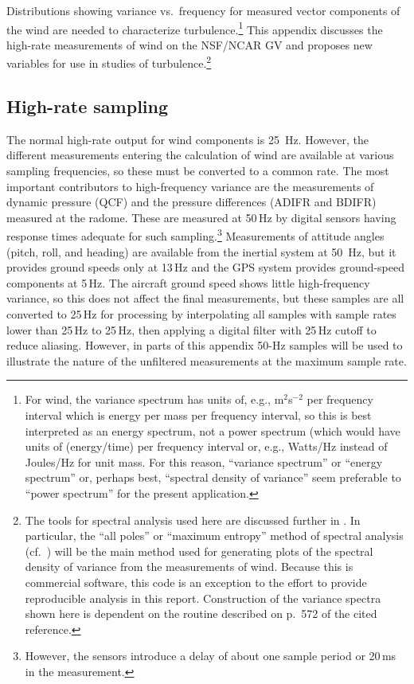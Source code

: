 \documentclass[12pt,twoside,english]{article}\usepackage[]{graphicx}\usepackage[]{color}
\let\OrgIndex\index
\renewcommand*{\index}[1]{\OrgIndex{#1}}
\begin{document}
Distributions showing variance vs.~frequency for measured vector components of the wind are needed to characterize turbulence.\footnote{For wind, the variance spectrum has units of, e.g., m$^{2}$s$^{-2}$ per frequency interval which is energy per mass per frequency interval, so this is best interpreted as an energy spectrum, not a power spectrum (which would have units of (energy/time) per frequency interval or, e.g., Watts/Hz instead of Joules/Hz for unit mass. For this reason, ``variance spectrum'' or ``energy spectrum'' or, perhaps best, ``spectral density of variance'' seem preferable to ``power spectrum'' for the present application.} This appendix discusses the high-rate measurements of wind on the NSF/NCAR GV and proposes new variables for use in studies of turbulence.\footnote{The tools for spectral analysis used here are discussed further in \citet{Cooper1994}. In particular, the ``all poles'' or ``maximum entropy'' method of spectral analysis (cf.~\citet{Press:1992:NRC:148286}) will be the main method used for generating plots of the spectral density of variance from the measurements of wind. Because this is commercial software, this code is an exception to the effort to provide reproducible analysis in this report. Construction of the variance spectra shown here is dependent on the routine described on p.~572 of the cited reference.} 

\subsection{High-rate sampling\label{sub:high-rate}}

The normal high-rate output for wind components is 25~Hz. However, the different measurements entering the calculation of wind are available at various sampling frequencies, so these must be converted to a common rate. The most important contributors to high-frequency variance are the measurements of dynamic pressure (QCF) and the pressure differences (ADIFR and BDIFR) measured at the radome. These are measured at 50\,Hz by digital sensors having response times adequate for such sampling.\footnote{However, the sensors introduce a delay of about one sample period or 20\,ms in the measurement.} Measurements of attitude angles (pitch, roll, and heading) are available from the inertial system at 50~Hz, but it provides ground speeds only at 13\,Hz and the GPS system provides ground-speed components at 5\,Hz. The aircraft ground speed shows little high-frequency variance, so this does not affect the final measurements, but these samples are all converted to 25\,Hz for processing by interpolating all samples with sample rates lower than 25\,Hz to 25\,Hz, then applying a digital filter with 25\,Hz cutoff to reduce aliasing. However, in parts of this appendix 50-Hz samples will be used to illustrate the nature of the unfiltered measurements at the maximum sample rate. 
\end{document}
